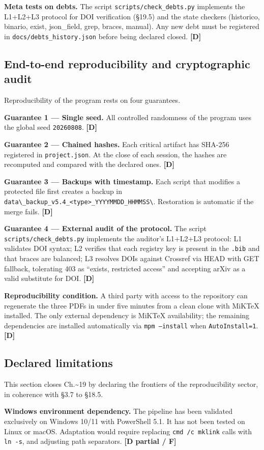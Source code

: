 ﻿\documentclass[11pt,letterpaper]{article}
\begin{document}
\textbf{Meta tests on debts.} The script \texttt{scripts/check\_debts.py} implements the L1+L2+L3 protocol for DOI verification (§19.5) and the state checkers (historico, binario, exist, json\_field, grep, braces, manual). Any new debt must be registered in \texttt{docs/debts\_history.json} before being declared closed. \textbf{[D]}
\subsection{End-to-end reproducibility and cryptographic audit}
Reproducibility of the program rests on four guarantees.

\textbf{Guarantee 1 --- Single seed.} All controlled randomness of the program uses the global seed \texttt{20260808}. \textbf{[D]}

\textbf{Guarantee 2 --- Chained hashes.} Each critical artifact has SHA-256 registered in \texttt{project.json}. At the close of each session, the hashes are recomputed and compared with the declared ones. \textbf{[D]}

\textbf{Guarantee 3 --- Backups with timestamp.} Each script that modifies a protected file first creates a backup in \texttt{data\textbackslash\_backup\_v5.4\_<type>\_YYYYMMDD\_HHMMSS\textbackslash}. Restoration is automatic if the merge fails. \textbf{[D]}

\textbf{Guarantee 4 --- External audit of the protocol.} The script \texttt{scripts/check\_debts.py} implements the auditor's L1+L2+L3 protocol: L1 validates DOI syntax; L2 verifies that each registry key is present in the \texttt{.bib} and that braces are balanced; L3 resolves DOIs against Crossref via HEAD with GET fallback, tolerating 403 as ``exists, restricted access'' and accepting arXiv as a valid substitute for DOI. \textbf{[D]}

\textbf{Reproducibility condition.} A third party with access to the repository can regenerate the three PDFs in under five minutes from a clean clone with MiKTeX installed. The only external dependency is MiKTeX availability; the remaining dependencies are installed automatically via \texttt{mpm --install} when \texttt{AutoInstall=1}. \textbf{[D]}
\subsection{Declared limitations}
This section closes Ch.\textasciitilde{}19 by declaring the frontiers of the reproducibility sector, in coherence with §3.7 to §18.5.

\textbf{Windows environment dependency.} The pipeline has been validated exclusively on Windows 10/11 with PowerShell 5.1. It has not been tested on Linux or macOS. Adaptation would require replacing \texttt{cmd /c mklink} calls with \texttt{ln -s}, and adjusting path separators. \textbf{[D partial / F]}
\end{document}
